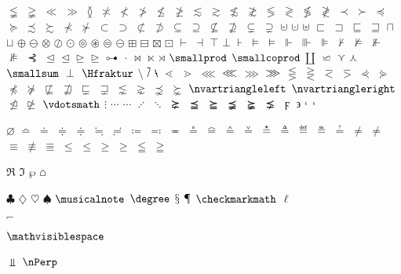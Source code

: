 \documentclass[captions=tableheading]{scrartcl}
\begin{document}
$\lneqq$
$\gneqq$
$\ll$
$\gg$
$\between$
$\nasymp$
$\nless$
$\ngtr$
$\nleq$
$\ngeq$
$\lesssim$
$\gtrsim$
$\nlesssim$
$\ngtrsim$
$\lessgtr$
$\gtrless$
$\nlessgtr$
$\ngtrless$
$\prec$
$\succ$
$\preccurlyeq$
$\succcurlyeq$
$\precsim$
$\succsim$
$\nprec$
$\nsucc$
$\subset$
$\supset$
$\nsubset$
$\nsupset$
$\subseteq$
$\supseteq$
$\nsubseteq$
$\nsupseteq$
$\subsetneq$
$\supsetneq$
$\cupleftarrow$
$\cupdot$
$\uplus$
$\sqsubset$
$\sqsupset$
$\sqsubseteq$
$\sqsupseteq$
$\sqcap$
$\sqcup$
$\oplus$
$\ominus$
$\otimes$
$\oslash$
$\odot$
$\circledcirc$
$\circledast$
$\circledequal$
$\circleddash$
$\boxplus$
$\boxminus$
$\boxtimes$
$\boxdot$
$\vdash$
$\dashv$
$\top$
$\bot$
$\assert$
$\models$
$\vDash$
$\Vdash$
$\Vvdash$
$\VDash$
$\nvdash$
$\nvDash$
$\nVdash$
$\nVDash$
$\prurel$
$\trianglelefteq$
$\unlhd$
$\trianglerighteq$
$\unrhd$
$\origof$
$\cdot$
$\bowtie$
$\ltimes$
$\rtimes$
$\smallprod$
$\smallcoprod$ $\amalg$
$\backsimeq$
$\curlyvee$
$\curlywedge$
$\smallsum$
$\perp$
$\Hfraktur$
$\setminus$
$\dsol$
$\rsolbar$
$\lessdot$
$\gtrdot$
$\lll$ $\llless$
$\ggg$ $\gggtr$
$\lesseqgtr$
$\gtreqless$
$\eqless$
$\eqgtr$
$\curlyeqprec$
$\curlyeqsucc$
$\npreccurlyeq$
$\nsucccurlyeq$
$\nsqsubseteq$
$\nsqsupseteq$
$\sqsubsetneq$
$\sqsupsetneq$
$\lnsim$
$\gnsim$
$\precnsim$
$\succnsim$
$\nvartriangleleft$
$\nvartriangleright$
$\ntrianglelefteq$
$\ntrianglerighteq$
$\vdotsmath$
$\vdots$
$\unicodecdots$
$\cdots$
$\adots$
$\ddots$
$\succneq$
$\preceqq$
$\succeqq$
$\precneqq$
$\succneqq$
$\precneq$
$\digamma$
$\backepsilon$
$\lhook$
$\rhook$

$\diameter$
$\bumpeq$
$\doteq$
$\Doteq$ $\doteqdot$
$\fallingdotseq$
$\risingdotseq$
$\coloneq$
$\eqcolon$
$\eqcirc$
$\circeq$
$\arceq$
$\wedgeq$
$\veeeq$
$\stareq$
$\triangleq$
$\eqdef$
$\measeq$
$\questeq$
$\ne$ $\neq$
$\equiv$
$\nequiv$
$\Equiv$
$\leq$ $\le$
$\geq$ $\ge$
$\leqq$
$\geqq$

$\Re$
$\Im$
$\wp$
$\house$

$\clubsuit$
$\diamondsuit$
$\heartsuit$
$\spadesuit$
$\musicalnote$
$\degree$
$\mathsection$
$\mathparagraph$
$\checkmarkmath$
$\ell$

$\invnot$

$\mathvisiblespace$

$\Perp$
$\nPerp$
\end{document}
